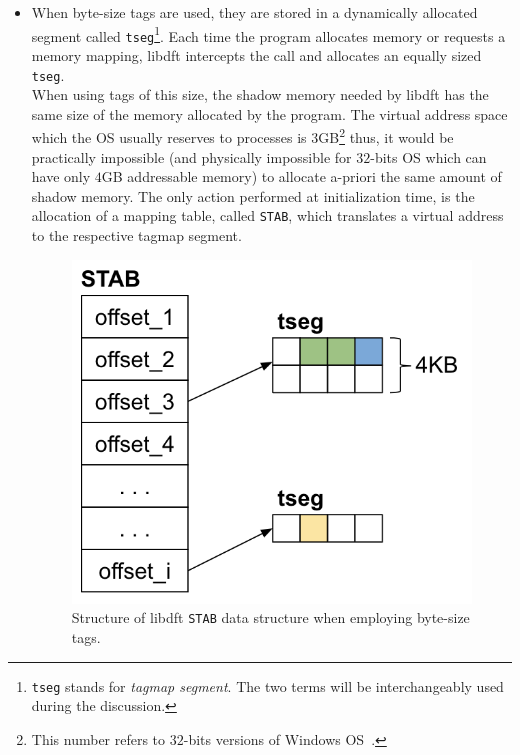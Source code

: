 \documentclass[LaM,binding=0.6cm]{sapthesis}
\begin{document}
\begin{itemize}
\item When byte-size tags are used, they are stored in a dynamically allocated segment called \texttt{tseg}\footnote{\texttt{tseg} stands for \textit{tagmap segment}. The two terms will be interchangeably used during the discussion.}. Each time the program allocates memory or requests a memory mapping, libdft intercepts the call and allocates an equally sized \texttt{tseg}.\\
When using tags of this size, the shadow memory needed by libdft has the same size of the memory allocated by the program. The virtual address space which the OS usually reserves to processes is $3$GB\footnote{This number refers to $32$-bits versions of Windows OS~\cite{VirtualA15:online}.} thus, it would be practically impossible (and physically impossible for $32$-bits OS which can have only $4$GB addressable memory) to allocate a-priori the same amount of shadow memory. The only action performed at initialization time, is the allocation of a mapping table, called \texttt{STAB}, which translates a virtual address to the respective tagmap segment.

\begin{figure}[h!]
\centering
\includegraphics[scale=.7]{images/techn10}
\caption{Structure of libdft \texttt{STAB} data structure when employing byte-size tags.}
\end{figure}


\end{itemize}
\end{document}
